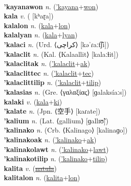  \label{'kayanaak} \\
\textbf{'kayanawon} \textit{n.} (\hyperref['kayana]{'kayana}+\hyperref[won]{won})
 \label{'kayanawon} \\
\textbf{kala} \textit{v.} ( [kʰaɽa])
 \label{kala} \\
\textbf{kalalon} \textit{n.} (\hyperref[kala]{kala}+\hyperref[lon]{lon})
 \label{kalalon} \\
\textbf{kalalyan} \textit{n.} (\hyperref[kala]{kala}+\hyperref[lyan]{lyan})
 \label{kalalyan} \\
\textbf{'kalaci} \textit{n.} (Urd. ⟨کراچی‎⟩ [kəˈɾaːt͡ʃi])
 \label{'kalaci} \\
\textbf{'kalaclit} \textit{n.} (Kal. ⟨Kalaallit⟩ [kalaːɬit])
 \label{'kalaclit} \\
\textbf{'kalaclitak} \textit{n.} (\hyperref['kalaclit]{'kalaclit}+\hyperref[ak]{ak})
 \label{'kalaclitak} \\
\textbf{'kalaclittec} \textit{n.} (\hyperref['kalaclit]{'kalaclit}+\hyperref[tec]{tec})
 \label{'kalaclittec} \\
\textbf{'kalaclittilip} \textit{n.} (\hyperref['kalaclit]{'kalaclit}+\hyperref[tilip]{tilip})
 \label{'kalaclittilip} \\
\textbf{'kalasias} \textit{n.} (Gre. ⟨γαλαξίας⟩ [ɡalaksíaːs])
 \label{'kalasias} \\
\textbf{kalaki} \textit{v.} (\hyperref[kala]{kala}+\hyperref[ki]{ki})
 \label{kalaki} \\
\textbf{'kalate} \textit{n.} (Jpn. ⟨空手⟩ [kaɾate])
 \label{'kalate} \\
\textbf{'kalium} \textit{n.} (Lat. ⟨gallium⟩ [ɡallɪʊ̃])
 \label{'kalium} \\
\textbf{'kalinako} \textit{n.} (Crb. ⟨Kalinago⟩ [kalinaɡo])
 \label{'kalinako} \\
\textbf{'kalinakoak} \textit{n.} (\hyperref['kalinako]{'kalinako}+\hyperref[ak]{ak})
 \label{'kalinakoak} \\
\textbf{'kalinakolawt} \textit{n.} (\hyperref['kalinako]{'kalinako}+\hyperref[lawt]{lawt})
 \label{'kalinakolawt} \\
\textbf{'kalinakotilip} \textit{n.} (\hyperref['kalinako]{'kalinako}+\hyperref[tilip]{tilip})
 \label{'kalinakotilip} \\
\textbf{kalita} \textit{v.} (\hyperref[natula]{\sout{natula}})
 \label{kalita} \\
\textbf{kalitalon} \textit{n.} (\hyperref[kalita]{kalita}+\hyperref[lon]{lon})
 \label{kalitalon} \\
